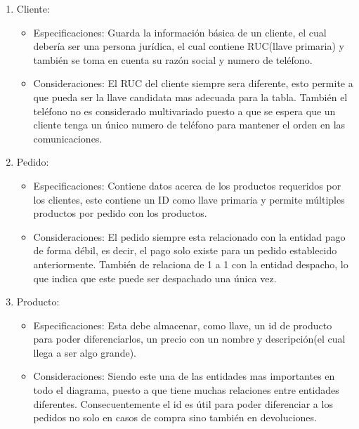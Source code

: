 \documentclass[10pt, a4paper,openany]{report}
\begin{document}
\begin{enumerate}
	\item  Cliente:
	      \begin{itemize}
		      \item Especificaciones:
		            Guarda la información básica de un cliente, el cual debería ser una persona jurídica, el cual contiene RUC(llave primaria) y también se toma en cuenta
		            su razón social y numero de teléfono.
		      \item Consideraciones:
		            El RUC del cliente siempre sera diferente, esto permite a que pueda ser la llave candidata mas adecuada para la tabla. También el teléfono no es considerado multivariado
		            puesto a que se espera que un cliente tenga un único numero de teléfono para mantener el orden en las comunicaciones.
	      \end{itemize}

	\item  Pedido:
	      \begin{itemize}
		      \item Especificaciones:
		            Contiene datos acerca de los productos requeridos por los clientes, este contiene un ID como llave primaria y permite múltiples productos por pedido con los productos.
		      \item Consideraciones:
		            El pedido siempre esta relacionado con la entidad pago de forma débil, es decir, el pago solo existe para un pedido establecido anteriormente. También de relaciona de 1 a 1 con la entidad
		            despacho, lo que indica que este puede ser despachado una única vez.
	      \end{itemize}

	\item  Producto:
	      \begin{itemize}
		      \item Especificaciones:
		            Esta debe almacenar, como llave, un id de producto para poder diferenciarlos, un precio con un nombre y descripción(el cual llega a ser algo grande).
		      \item Consideraciones:
		            Siendo este una de las entidades mas importantes en todo el diagrama, puesto a que tiene muchas relaciones entre entidades diferentes. Consecuentemente el id es útil para poder diferenciar a los pedidos
		            no solo en casos de compra sino también en devoluciones.
	      \end{itemize}


\end{enumerate}
\end{document}
